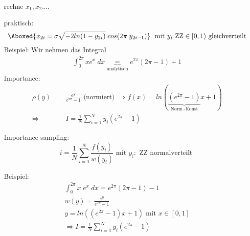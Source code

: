 \documentclass[12pt]{article}
\begin{document}
\begin{itemize}
rechne $x_1,x_2$....

praktisch: \begin{align}
\Aboxed{x_{2i}= \sigma \sqrt{-2 ln(1-y_{2i})} \; cos(2\pi \; y_{2i-1}) } \; \mbox{ mit } y_i\mbox{ ZZ} \in [0, 1) \mbox{ gleichverteilt}
\end{align}
Beispiel: Wir nehmen das Integral
\begin{align*}
\int_0^{2\pi} x e^x \; dx \underbrace{=}_\text{analytisch} e^{2\pi} (2\pi -1) +1
\end{align*} 
Importance: \begin{align*}
\rho(y)=& \frac{e^y}{e^{2\pi} -1} \mbox{ (normiert) } \Rightarrow f(x)= ln(\underbrace{(e^{2\pi}-1)}_\text{Norm.-Konst} x+1) \\
\Rightarrow & I = \frac{1}{N} \sum_{i=1}^N y_i (e^{2\pi}-1)
\end{align*}
\end{itemize}
 
 Importance sampling: \begin{equation}
 i= \frac{1}{N} \sum_{i=1}^N \frac{f(y_i)}{w(y_i)} \mbox{ mit } y_i: \mbox{ ZZ normalverteilt }
 \end{equation}
 
 Beispiel: \begin{align}
 \int_0^{2\pi} x \; e^x \; dx = e^{2\pi} (2\pi -1) -1\\
 w(y)= \frac{e^y}{e^{2\pi}-1} \\
 y= ln\left( (e^{2\pi} -1)x+1\right) \mbox{ mit } x \in [ 0,1] \\ \Rightarrow I= \frac{1}{N}\sum_{i=1}^N y_i (e^{2\pi}-1)
 \end{align}
 
\end{document}
